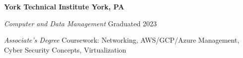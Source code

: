 \textbf{York Technical Institute \hfill York, PA} \par
\textit{Computer and Data Management} \hfill Graduated 2023\par
\textit{Associate's Degree}
Coursework: Networking, AWS/GCP/Azure Management, Cyber Security Concepts, Virtualization \par
